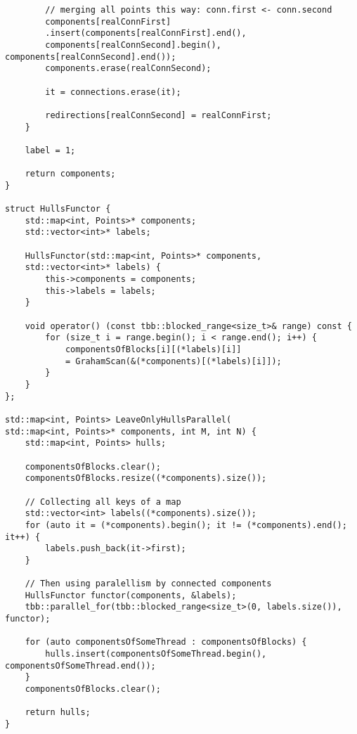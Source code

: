 \documentclass[14pt, russian]{extarticle}
\begin{document}
\begin{lstlisting}
		// merging all points this way: conn.first <- conn.second
		components[realConnFirst]
		.insert(components[realConnFirst].end(),
		components[realConnSecond].begin(), components[realConnSecond].end());
		components.erase(realConnSecond);
		
		it = connections.erase(it);
		
		redirections[realConnSecond] = realConnFirst;
	}
	
	label = 1;
	
	return components;
}

struct HullsFunctor {
	std::map<int, Points>* components;
	std::vector<int>* labels;
	
	HullsFunctor(std::map<int, Points>* components,
	std::vector<int>* labels) {
		this->components = components;
		this->labels = labels;
	}
	
	void operator() (const tbb::blocked_range<size_t>& range) const {
		for (size_t i = range.begin(); i < range.end(); i++) {
			componentsOfBlocks[i][(*labels)[i]]
			= GrahamScan(&(*components)[(*labels)[i]]);
		}
	}
};

std::map<int, Points> LeaveOnlyHullsParallel(
std::map<int, Points>* components, int M, int N) {
	std::map<int, Points> hulls;
	
	componentsOfBlocks.clear();
	componentsOfBlocks.resize((*components).size());
	
	// Collecting all keys of a map
	std::vector<int> labels((*components).size());
	for (auto it = (*components).begin(); it != (*components).end(); it++) {
		labels.push_back(it->first);
	}
	
	// Then using paralellism by connected components
	HullsFunctor functor(components, &labels);
	tbb::parallel_for(tbb::blocked_range<size_t>(0, labels.size()), functor);
	
	for (auto componentsOfSomeThread : componentsOfBlocks) {
		hulls.insert(componentsOfSomeThread.begin(), componentsOfSomeThread.end());
	}
	componentsOfBlocks.clear();
	
	return hulls;
}
	\end{lstlisting}
	\newpage
\end{document}
